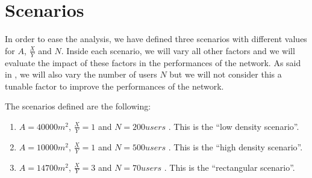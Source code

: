 \section{Scenarios}\label{sec:scenarios}

In order to ease the analysis, we have defined three scenarios with different
values for \(A\), \(\frac{X}{Y}\) and \(N\). Inside each scenario, we will vary
all other factors and we will evaluate the impact of these factors in the
performances of the network. As said in , we will also vary
the number of users \(N\) but we will not consider this a tunable factor to
improve the performances of the network.

The scenarios defined are the following:
\begin{enumerate}
	\item \(A = 40000m^2\), \(\frac{X}{Y} = 1\)  and \(N = 200\mathit{users}\) . This is the ``low density
		scenario''.
	\item \(A = 10000m^2\), \(\frac{X}{Y} = 1\)  and \(N = 500\mathit{users}\) . This is the ``high density
		scenario''.
	\item \(A = 14700m^2\), \(\frac{X}{Y} = 3\)  and \(N = 70\mathit{users}\) .  This is the ``rectangular
		scenario''.
\end{enumerate}
